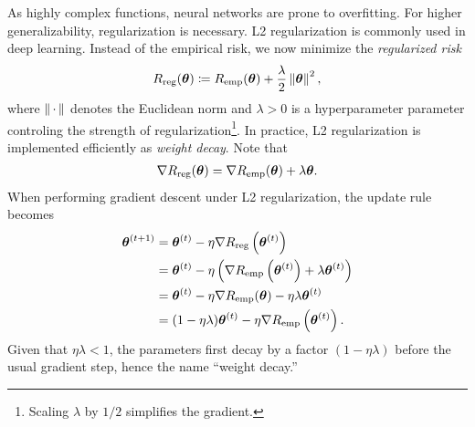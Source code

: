 As highly complex functions, neural networks are prone to overfitting. For higher generalizability, regularization is necessary. L2 regularization is commonly used in deep learning. Instead of the empirical risk, we now minimize the \emph{regularized risk}
\begin{equation*}
  R_{\textup{reg}}(\bm{\theta}) \coloneqq R_{\textup{emp}}(\bm{\theta}) + \frac{\lambda}{2} \left\| \bm{\theta} \right\|^2,
\end{equation*}
where $\left\| \,\cdot\, \right\|$ denotes the Euclidean norm and $\lambda > 0$ is a hyperparameter parameter controling the strength of regularization\footnote{Scaling $\lambda$ by $1/2$ simplifies the gradient.}. In practice, L2 regularization is implemented efficiently as \emph{weight decay}. Note that
\begin{align*}
  \nabla R_{\textup{reg}}(\bm{\theta}) = \nabla R_{\textup{emp}}(\bm{\theta}) + \lambda \bm{\theta}.
\end{align*}
When performing gradient descent under L2 regularization, the update rule becomes
\begin{align*}
  \bm{\theta}^{(t+1)} &= \bm{\theta}^{(t)} - \eta \nabla R_{\textup{reg}}\left( \bm{\theta}^{(t)} \right) \\
  &= \bm{\theta}^{(t)} - \eta \left( \nabla R_{\textup{emp}}\left( \bm{\theta}^{(t)} \right) + \lambda \bm{\theta}^{(t)} \right) \\
  &= \bm{\theta}^{(t)} - \eta \nabla R_{\textup{emp}}(\bm{\theta}) - \eta \lambda \bm{\theta}^{(t)} \\
  &= (1 - \eta \lambda) \bm{\theta}^{(t)} - \eta \nabla R_{\textup{emp}}\left( \bm{\theta}^{(t)} \right).
\end{align*}
Given that $\eta \lambda < 1$, the parameters first decay by a factor $(1 - \eta \lambda)$ before the usual gradient step, hence the name ``weight decay.''

